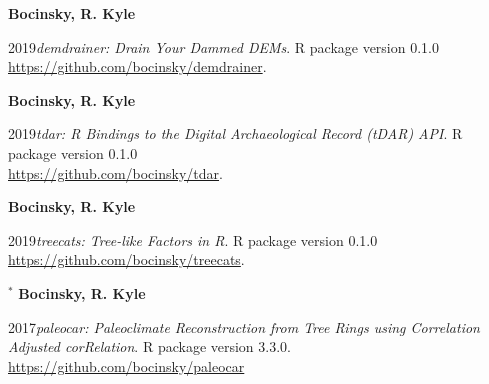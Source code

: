 {\bf Bocinsky, R. Kyle}
\begin{list1}
\item[] 2019\hspace{.2cm}\emph{demdrainer: Drain Your Dammed DEMs}. R package version 0.1.0 \\\href{https://github.com/bocinsky/demdrainer}{https://github.com/bocinsky/demdrainer}.
\end{list1}

{\bf Bocinsky, R. Kyle}
\begin{list1}
\item[] 2019\hspace{.2cm}\emph{tdar: R Bindings to the Digital Archaeological Record (tDAR) API}. R package version 0.1.0 \\\href{https://github.com/bocinsky/tdar}{https://github.com/bocinsky/tdar}.
\end{list1}


{\bf Bocinsky, R. Kyle}
\begin{list1}
\item[] 2019\hspace{.2cm}\emph{treecats: Tree-like Factors in R}. R package version 0.1.0 \\\href{https://github.com/bocinsky/treecats}{https://github.com/bocinsky/treecats}.
\end{list1}

$^\ast$ {\bf Bocinsky, R. Kyle}
\begin{list1}
\item[] 2017\hspace{.2cm}\emph{paleocar: Paleoclimate Reconstruction from Tree Rings using Correlation Adjusted corRelation}. R package version 3.3.0. \\\href{https://github.com/bocinsky/paleocar}{https://github.com/bocinsky/paleocar}
\end{list1}

